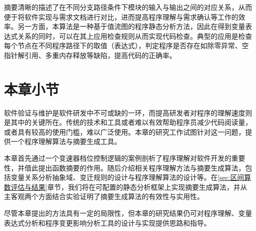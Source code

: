 摘要清晰的描述了在不同分支路径条件下模块的输入与输出之间的对应关系，从而便于将软件实现与需求文档进行对比，进而提高程序理解与需求确认等工作的效率。另一方面，本算法是一种基于值流图的程序静态分析方法，因此在得到变量表达式关系的同时，可以在其上应用检查规则从而实现代码检查。典型的应用是检查每个节点在不同程序路径下的取值（表达式），判定程序是否存在如除零异常、空指针解引用、多重内存释放等缺陷，提高代码的正确率。


\section{本章小节}
\label{sec:值流图总结}

软件验证与维护是软件研发中不可或缺的一环，而提高研发者对程序的理解速度则是其中的关键所在。传统的技术和工具或者难以有效帮助程序员减少代码阅读量，或者具有较高的使用门槛，难以广泛使用。本章的研究工作试图针对这一问题，提供一个程序理解算法与摘要生成工具。

本章首先通过一个变速器档位控制逻辑的案例剖析了程序理解对软件开发的重要性，并借此提出函数摘要的作用。随后介绍相关程序理解方法与摘要生成算法，包括变量关系分析抽象域、变迁规则的设计与程序理解算法的设计等。在\ref{sec:区间算数评估与结果}章节，我们将在可配置的静态分析框架上实现摘要生成算法，并从主客观两个方面结合实验证明了摘要生成算法的有效性与实用性。

尽管本章提出的方法具有一定的局限性，但本章的研究结果仍可对程序理解、变量表达式分析和程序变更影响分析工具的设计与实现提供思路和指导。








































